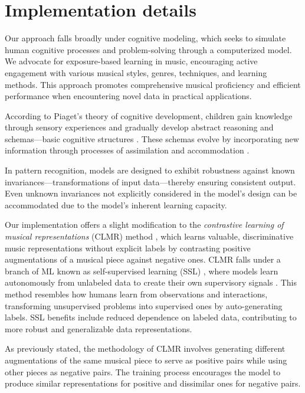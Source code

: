 \section{Implementation details}

Our approach falls broadly under cognitive modeling, which seeks to simulate human cognitive processes and problem-solving through a computerized model. We advocate for exposure-based learning in music, encouraging active engagement with various musical styles, genres, techniques, and learning methods. This approach promotes comprehensive musical proficiency and efficient performance when encountering novel data in practical applications.

According to Piaget's theory of cognitive development, children gain knowledge through sensory experiences and gradually develop abstract reasoning and schemas—basic cognitive structures \cite{Huitt2003PiagetsDevelopment}. These schemas evolve by incorporating new information through processes of assimilation and accommodation \cite{audioselfsupsurvey}.

In pattern recognition, models are designed to exhibit robustness against known invariances—transformations of input data—thereby ensuring consistent output. Even unknown invariances not explicitly considered in the model's design can be accommodated due to the model's inherent learning capacity.

Our implementation offers a slight modification to the \textit{contrastive learning of musical representations} (CLMR) method \cite{CLMR2021}, which learns valuable, discriminative music representations without explicit labels by contrasting positive augmentations of a musical piece against negative ones. CLMR falls under a branch of ML known as self-supervised learning (SSL) \cite{Balestriero2023ALearning}, where models learn autonomously from unlabeled data to create their own supervisory signals \cite{audioselfsupsurvey}. This method resembles how humans learn from observations and interactions, transforming unsupervised problems into supervised ones by auto-generating labels. SSL benefits include reduced dependence on labeled data, contributing to more robust and generalizable data representations.

As previously stated, the methodology of CLMR involves generating different augmentations of the same musical piece to serve as positive pairs while using other pieces as negative pairs. The training process encourages the model to produce similar representations for positive and dissimilar ones for negative pairs.

